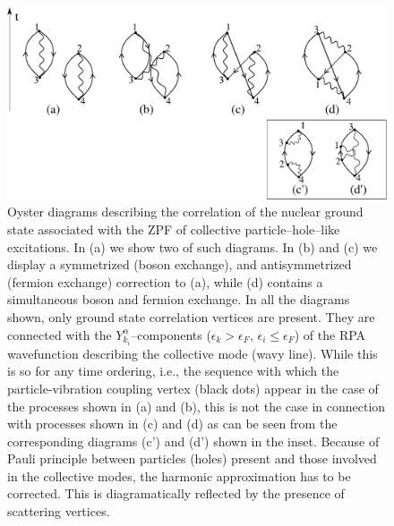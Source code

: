 \begin{figure}
\centerline {
\includegraphics*[width=12cm]{introduccion/figs/figintroA1}
}
\caption{Oyster diagrams describing the correlation of the nuclear ground state associated with the ZPF of  collective particle--hole--like excitations. In (a) we show two of such diagrams. In (b) and (c) we display a symmetrized (boson exchange), and antisymmetrized  (fermion exchange) correction to (a), while  (d) contains a simultaneous boson and fermion exchange. In all the diagrams shown, only ground state correlation vertices are present. They are connected with the $Y^\alpha_{k_i}$--components ($\epsilon_k>\epsilon_F, \,\epsilon_i\le\epsilon_F$) of the RPA wavefunction describing the collective mode (wavy line). While this is so for any time ordering, i.e., the sequence with which the particle-vibration coupling vertex (black dots) appear in the case of the processes shown in (a) and (b), this is not the case in connection with processes shown in (c) and (d) as can be seen from the corresponding diagrams (c') and (d') shown in the inset. Because of Pauli principle between particles (holes) present and those involved in the collective modes, the harmonic approximation has to be corrected. This is diagramatically reflected by the presence of scattering vertices.}
\label{figintroA1}
\end{figure}
